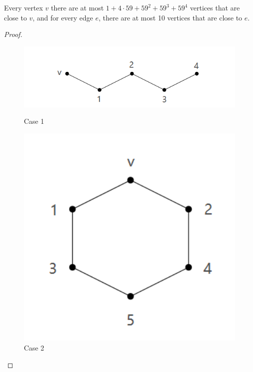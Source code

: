 \begin{claim}
Every vertex $v$ there are at most $1 + 4 \cdot 59 + 59^{2} + 59^{3} + 59^{4}$ vertices that are close to $v$, and for every edge $e$, there are at most 10 vertices that are close to $e$. \cite{dvorak2013threecoloring}
\end{claim}
\begin{proof}
    
    \begin{figure}[htbp]
    \centering
    \begin{minipage}[t]{0.48\textwidth}
    \centering
    \includegraphics[width=1\textwidth]{figure/592.png}
    \caption{Case 1}
    \end{minipage}
    \begin{minipage}[t]{0.28\textwidth}
    \centering
    \includegraphics[width=1\textwidth]{figure/591.png}
    \caption{Case 2}
    \end{minipage}
    \end{figure}

\end{proof}
